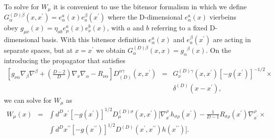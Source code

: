 To solve for $W_{\mu}$ it is convenient to use the bitensor formalism in which we define $G_{\alpha}^{(D)\beta}(x,x^{\prime})=e^a_{\alpha}(x)e^{\beta}_a(x^{\prime})$ where the D-dimensional $e^a_{\alpha}(x)$ vierbeins obey $g_{\mu\nu}(x)=\eta_{ab}e^{a}_{\mu}(x)e^{b}_{\nu}(x)$, with $a$ and $b$ referring to a fixed D-dimensional basis. With this bitensor definition $e^a_{\alpha}(x)$ and $e^{\beta}_a(x^{\prime})$ are acting in separate spaces, but  at $x=x^{\prime}$ we obtain $G_{\alpha}^{(D)\beta}(x,x)=g_{\alpha}^{\phantom{\alpha}\beta}(x)$. On the introducing the propagator that satisfies 
%
\begin{eqnarray}
\left[g_{\nu\alpha}\nabla_\beta\nabla^\beta + \left(\frac{D-2}{D}\right)\nabla_\nu \nabla_\alpha - R_{\nu\alpha}\right]D_{(D)}^{\alpha\gamma}(x,x^{\prime}) &=& G_{\nu}^{(D)\gamma}(x,x^{\prime}) [-g(x^{\prime})]^{-1/2}\times
\nonumber\\
&& \delta^{(D)}(x-x^{\prime}),
\label{A.43a}
\end{eqnarray}
%
we can solve for $W_{\mu}$ as
%
\begin{eqnarray}
W_{\mu}(x) &=& \int d^Dx^{\prime}[-g(x^{\prime})]^{1/2} D_{\mu}^{(D)\sigma}(x,x^{\prime})\bigg[ \nabla^{\rho}_{x^{\prime}} h_{\sigma\rho}(x^{\prime})-
\frac{1}{D-1}R_{\sigma\rho}(x^{\prime})\nabla^{\rho}_{x^{\prime}} \times
\nonumber\\
&&\int d^Dx^{\prime\prime}[-g(x^{\prime\prime})]^{1/2} D^{(D)}(x^{\prime},x^{\prime\prime}) h(x^{\prime\prime})\bigg].
\label{A.44a}
\end{eqnarray}
%

